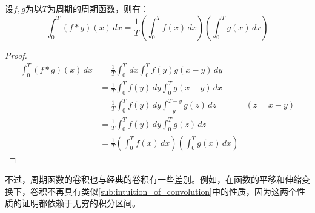 \begin{proposition}[“面积”关系]
    设$f,g$为以$T$为周期的周期函数，则有：
    \[\int_0^{T}(f*g)(x)\,dx=\frac{1}{T}\left(\int_0^{T}f(x)\,dx\right)\left(\int_0^{T}g(x)\,dx\right)\]
\end{proposition}
\begin{proof}
    \begin{align*}
        \int_0^{T}(f*g)(x)\,dx&=\frac{1}{T}\int_0^{T}\,dx\int_0^{T}f(y)g(x-y)\,dy\\
        &=\frac{1}{T}\int_0^{T}f(y)\,dy\int_0^{T}g(x-y)\,dx\\
        &=\frac{1}{T}\int_0^{T}f(y)\,dy\int_{-y}^{T-y}g(z)\,dz&(z=x-y)\\
        &=\frac{1}{T}\int_0^{T}f(y)\,dy\int_0^{T}g(z)\,dz\\
        &=\frac{1}{T}\left(\int_0^{T}f(x)\,dx\right)\left(\int_0^{T}g(x)\,dx\right)
    \end{align*}
\end{proof}

不过，周期函数的卷积也与经典的卷积有一些差别。例如，在函数的平移和伸缩变换下，卷积不再具有类似\ref{sub:intuition_of_convolution}中的性质，因为这两个性质的证明都依赖于无穷的积分区间。

